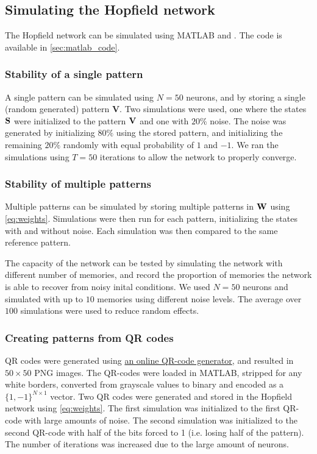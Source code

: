 \subsection{Simulating the Hopfield network}
The Hopfield network can be simulated using MATLAB and . The code is available in \cref{sec:matlab_code}.
\subsubsection*{Stability of a single pattern}
A single pattern can be simulated using $N=50$ neurons, and by storing a single (random generated) pattern $\mathbf{V}$. Two simulations were used, one where the states $\bf S$ were initialized to the pattern $\bf V$ and one with $20\%$ noise. The noise was generated by initializing $80\%$ using the stored pattern, and initializing the remaining $20\%$ randomly with equal probability of $1$ and $-1$. We ran the simulations using $T=50$ iterations to allow the network to properly converge.
\subsubsection*{Stability of multiple patterns}
Multiple patterns can be simulated by storing multiple patterns in $\bf W$ using \cref{eq:weights}. Simulations were then run for each pattern, initializing the states with and without noise. Each simulation was then compared to the same reference pattern.

The capacity of the network can be tested by simulating the network with different number of memories, and record the proportion of memories the network is able to recover from noisy inital conditions. We used $N=50$ neurons and simulated with up to $10$ memories using different noise levels. The average over $100$ simulations were used to reduce random effects.

\subsubsection*{Creating patterns from QR codes}
QR codes were generated using \href{https://miniwebtool.com/qr-code-generator/}{an online QR-code generator}, and resulted in $50 \times 50$ PNG images. The QR-codes were loaded in MATLAB, stripped for any white borders, converted from grayscale values to binary and encoded as a $\{1, -1\}^{N \times 1}$ vector. Two QR codes were generated and stored in the Hopfield network using \cref{eq:weights}. The first simulation was initialized to the first QR-code with large amounts of noise. The second simulation was initialized to the second QR-code with half of the bits forced to 1 (i.e. losing half of the pattern). The number of iterations was increased due to the large amount of neurons.



